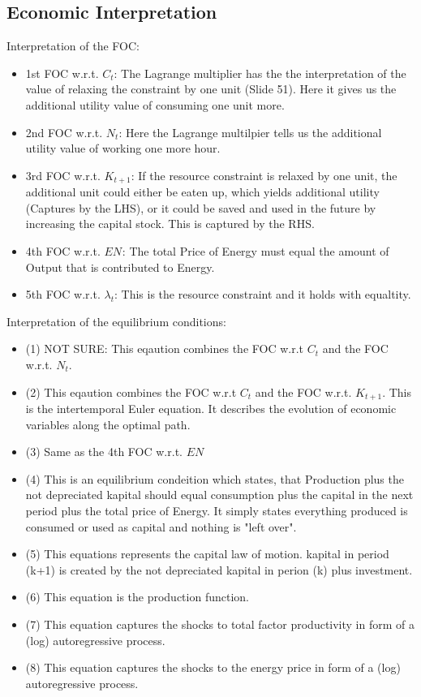 \documentclass[a4paper,11pt]{article}
\begin{document}
\subsection{Economic Interpretation}
Interpretation of the FOC:
\begin{itemize}
    \item 1st FOC w.r.t. $C_t$:  The Lagrange multiplier has the the interpretation of the value of relaxing the constraint by one unit (Slide 51). Here it gives us the additional utility value of consuming one unit more.
    \item 2nd FOC w.r.t. $N_t$: Here the Lagrange multilpier tells us the additional utility value of working one more hour. 
    \item 3rd FOC w.r.t. $K_{t+1}$: If the resource constraint is relaxed by one unit, the additional unit could either be eaten up, which yields additional utility (Captures by the LHS), or it could be saved and used in the future by increasing the capital stock. This is captured by the RHS.
    \item 4th FOC w.r.t. $EN_{}$: The total Price of Energy must equal the amount of Output that is contributed to Energy. 
    \item 5th FOC w.r.t. $\lambda_t$: This is the resource constraint and it holds with equaltity.
\end{itemize}

Interpretation of the equilibrium conditions:\\ 
\begin{itemize}
    \item (1) NOT SURE: This eqaution combines the FOC w.r.t $C_t$ and the FOC w.r.t. $N_t$.
    \item (2) This eqaution combines the FOC w.r.t $C_t$ and the FOC w.r.t. $K_{t+1}$. This is the intertemporal Euler equation. It describes the evolution of economic variables along the optimal path. 
    \item (3) Same as the 4th FOC w.r.t. $EN_{}$
    \item (4) This is an equilibrium condeition which states, that  Production plus the not depreciated kapital should equal consumption plus the capital in the next period plus the total price of Energy. It simply states everything produced is consumed or used as capital and nothing is "left over". 
    \item (5) This equations represents the capital law of motion. kapital in period (k+1) is created by the not depreciated kapital in perion (k) plus investment.
    \item (6) This equation is the production function. 
    \item (7) This equation captures the shocks to total factor productivity in form of a (log) autoregressive process.
    \item (8) This equation captures the shocks to the energy price in form of a (log) autoregressive process. 
\end{itemize}
\end{document}
